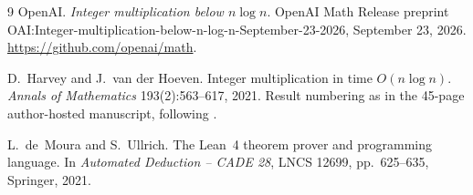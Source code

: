 \documentclass[11pt]{article}
\numberwithin{equation}{section}
\numberwithin{table}{section}
\theoremstyle{remark}
\newcommand{\OAI}{\cite{OAI}}
\begin{document}
\begin{thebibliography}{9}
OpenAI. \emph{Integer multiplication below $n\log n$}. OpenAI Math
Release preprint OAI:Integer-multiplication-below-n-log-n-September-23-2026,
September 23, 2026.
\url{https://github.com/openai/math}.

D.~Harvey and J.~van der Hoeven. Integer multiplication in time
$O(n\log n)$. \emph{Annals of Mathematics} 193(2):563--617, 2021.
Result numbering as in the 45-page author-hosted manuscript, following
\OAI.

L.~de~Moura and S.~Ullrich. The Lean~4 theorem prover and programming
language. In \emph{Automated Deduction -- CADE 28}, LNCS 12699,
pp.~625--635, Springer, 2021.
\end{thebibliography}
\end{document}
